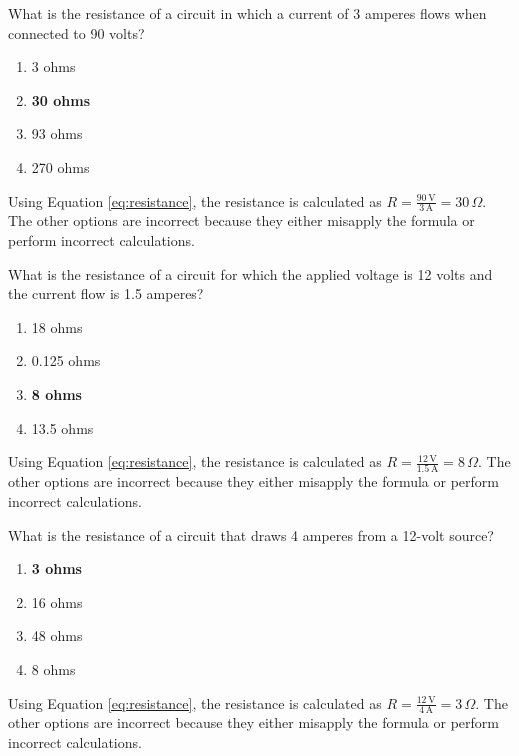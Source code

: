 \begin{tcolorbox}[colback=gray!10!white,colframe=black!75!black,title={T5D04}]
    What is the resistance of a circuit in which a current of 3 amperes flows when connected to 90 volts?
    \begin{enumerate}[label=\Alph*),noitemsep]
        \item 3 ohms
        \item \textbf{30 ohms}
        \item 93 ohms
        \item 270 ohms
    \end{enumerate}
\end{tcolorbox}
Using Equation \ref{eq:resistance}, the resistance is calculated as \(R = \frac{90\,\text{V}}{3\,\text{A}} = 30\,\Omega\). The other options are incorrect because they either misapply the formula or perform incorrect calculations.

\begin{tcolorbox}[colback=gray!10!white,colframe=black!75!black,title={T5D05}]
    What is the resistance of a circuit for which the applied voltage is 12 volts and the current flow is 1.5 amperes?
    \begin{enumerate}[label=\Alph*),noitemsep]
        \item 18 ohms
        \item 0.125 ohms
        \item \textbf{8 ohms}
        \item 13.5 ohms
    \end{enumerate}
\end{tcolorbox}
Using Equation \ref{eq:resistance}, the resistance is calculated as \(R = \frac{12\,\text{V}}{1.5\,\text{A}} = 8\,\Omega\). The other options are incorrect because they either misapply the formula or perform incorrect calculations.

\begin{tcolorbox}[colback=gray!10!white,colframe=black!75!black,title={T5D06}]
    What is the resistance of a circuit that draws 4 amperes from a 12-volt source?
    \begin{enumerate}[label=\Alph*),noitemsep]
        \item \textbf{3 ohms}
        \item 16 ohms
        \item 48 ohms
        \item 8 ohms
    \end{enumerate}
\end{tcolorbox}
Using Equation \ref{eq:resistance}, the resistance is calculated as \(R = \frac{12\,\text{V}}{4\,\text{A}} = 3\,\Omega\). The other options are incorrect because they either misapply the formula or perform incorrect calculations.

